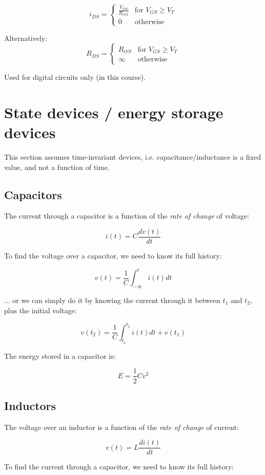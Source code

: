 \documentclass[12pt,a4paper]{report}
\begin{document}
\[ 
  i_{DS} = \begin{cases}
  \frac{V_{DS}}{R_{ON}} & \text{for $V_{GS} \ge V_T$} \\
  0 & \text{otherwise}
  \end{cases}
\]

Alternatively:
\[ 
  R_{DS} = \begin{cases}
  R_{ON} & \text{for $V_{GS} \ge V_T$} \\
  \infty & \text{otherwise}
  \end{cases}
\]

Used for digital circuits only (in this course).

\section{State devices / energy storage devices}
This section assumes time-invariant devices, i.e. capacitance/inductance is a fixed value, and not a function of time.

\subsection{Capacitors}

The current through a capacitor is a function of the \emph{rate of change} of voltage:

\[ i(t) = C \frac{dv(t)}{dt} \]

To find the voltage over a capacitor, we need to know its full history:

\[ v(t) = \frac{1}{C} \int_{-\infty}^{t} i(t) dt \]

... or we can simply do it by knowing the current through it between $t_1$ and $t_2$, plus the initial voltage:

\[ v(t_2) = \frac{1}{C} \int_{t_1}^{t_2} i(t) dt + v(t_1) \]

The energy stored in a capacitor is:

\[ E = \frac{1}{2} C v^2 \]

\subsection{Inductors}

The voltage over an inductor is a function of the \emph{rate of change} of current:

\[ v(t) = L \frac{di(t)}{dt} \]

To find the current through a capacitor, we need to know its full history:
\end{document}
